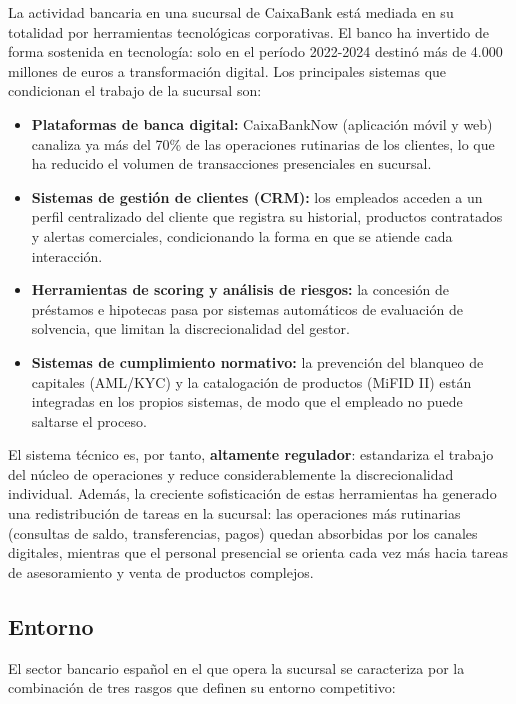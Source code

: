 La actividad bancaria en una sucursal de CaixaBank está mediada en su totalidad por
herramientas tecnológicas corporativas. El banco ha invertido de forma sostenida en
tecnología: solo en el período 2022-2024 destinó más de 4.000 millones de euros a
transformación digital. Los principales sistemas que condicionan
el trabajo de la sucursal son:

\begin{itemize}
  \item \textbf{Plataformas de banca digital:} CaixaBankNow (aplicación móvil y web)
    canaliza ya más del 70\% de las operaciones rutinarias de los clientes, lo que ha
    reducido el volumen de transacciones presenciales en sucursal.
  \item \textbf{Sistemas de gestión de clientes (CRM):} los empleados acceden a un
    perfil centralizado del cliente que registra su historial, productos contratados y
    alertas comerciales, condicionando la forma en que se atiende cada interacción.
  \item \textbf{Herramientas de scoring y análisis de riesgos:} la concesión de
    préstamos e hipotecas pasa por sistemas automáticos de evaluación de solvencia,
    que limitan la discrecionalidad del gestor.
  \item \textbf{Sistemas de cumplimiento normativo:} la prevención del blanqueo de
    capitales (AML/KYC) y la catalogación de productos (MiFID II) están integradas en
    los propios sistemas, de modo que el empleado no puede saltarse el proceso.
\end{itemize}

El sistema técnico es, por tanto, \textbf{altamente regulador}: estandariza el trabajo
del núcleo de operaciones y reduce considerablemente la discrecionalidad individual.
Además, la creciente sofisticación de estas herramientas ha generado una redistribución
de tareas en la sucursal: las operaciones más rutinarias (consultas de saldo, transferencias,
pagos) quedan absorbidas por los canales digitales, mientras que el personal presencial
se orienta cada vez más hacia tareas de asesoramiento y venta de productos complejos.

\subsection{Entorno}

El sector bancario español en el que opera la sucursal se caracteriza por la combinación
de tres rasgos que definen su entorno competitivo:

